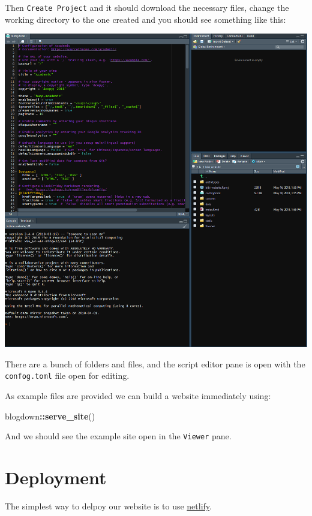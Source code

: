 \documentclass[12pt,]{book}
\newenvironment{Shaded}{\begin{snugshade}}{\end{snugshade}}
\newcommand{\KeywordTok}[1]{\textcolor[rgb]{0.13,0.29,0.53}{\textbf{#1}}}
\newcommand{\OperatorTok}[1]{\textcolor[rgb]{0.81,0.36,0.00}{\textbf{#1}}}
\newcommand{\NormalTok}[1]{#1}
\theoremstyle{definition}
\theoremstyle{definition}
\theoremstyle{definition}
\theoremstyle{remark}
\begin{document}
Then \texttt{Create\ Project} and it should download the necessary
files, change the working directory to the one created and you should
see something like this:

\includegraphics[width=1.2\linewidth]{img/initial-site}

There are a bunch of folders and files, and the script editor pane is
open with the \texttt{confog.toml} file open for editing.

As example files are provided we can build a website immediately using:

\begin{Shaded}
\begin{Highlighting}[]
\NormalTok{blogdown}\OperatorTok{::}\KeywordTok{serve_site}\NormalTok{()}
\end{Highlighting}
\end{Shaded}

And we should see the example site open in the \texttt{Viewer} pane.

\hypertarget{deployment}{\section{Deployment}\label{deployment}}

The simplest way to delpoy our website is to use
\href{https://www.netlify.com/}{netlify}.
\end{document}
